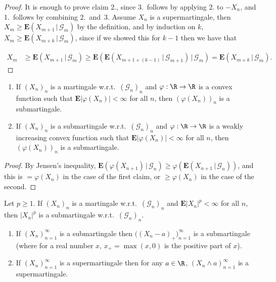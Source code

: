 \begin{proof}
It is enough to prove claim 2., since 3.\ follows by
applying 2. to $-X_n$, and 1.~follows by combining
2.~and~3. Assume $X_n$ is a supermartingale, then
$X_m\ge
\mathbf{E}\left(X_{m+1}\,|\,\mathcal{G}_m\right)$
by the definition, and by induction on $k$,
$X_m\ge
\mathbf{E}\left(X_{m+k}\,|\,\mathcal{G}_m\right)$,
since if we showed this for $k-1$ then we have that

\begin{align*}
X_m &\ge \mathbf{E}\left(X_{m+1}\,|\,\mathcal{G}_m\right)
\ge \mathbf{E}\left(\mathbf{E}\left(X_{m+1+(k-1)}\,|\,\mathcal{G}_{m+1}\right)\,|\,\mathcal{G}_m\right)
= \mathbf{E}\left(X_{m+k}\,|\,\mathcal{G}_m\right).
\end{align*}

\end{proof}

\begin{thm}

\begin{enumerate}[label=\arabic*.]
\item If $(X_n)_n$ is a martingale w.r.t.\
$(\mathcal{G}_n)_n$ and $\varphi:\R\to\R$ is a convex
function such that $\mathbf{E}|\varphi(X_n)|<\infty$
for all $n$, then $(\varphi(X_n))_n$ is a
submartingale.

\item If $(X_n)_n$ is a submartingale w.r.t.\
$(\mathcal{G}_n)_n$ and $\varphi:\R\to\R$ is a weakly
increasing convex function such that
$\mathbf{E}|\varphi(X_n)|<\infty$ for all $n$, then
$(\varphi(X_n))_n$ is a submartingale.
\end{enumerate}

\end{thm}

\begin{proof}
By Jensen's inequality,
$\mathbf{E}\left(\varphi(X_{n+1})\,|\,\mathcal{G}_n\right)
\ge
\varphi\left(\mathbf{E}\left(X_{n+1}\,|\,\mathcal{G}_n\right)\right)$,
and this is $= \varphi(X_n)$ in the case of the first
claim, or $\ge \varphi(X_n)$ in the case of the
second.
\end{proof}

\begin{cor}
Let $p\ge 1$. If $(X_n)_n$ is a martingale w.r.t.\
$(\mathcal{G}_n)_n$ and $\mathbf{E}|X_n|^p<\infty$
for all $n$, then $|X_n|^p$ is a submartingale
w.r.t.\ $(\mathcal{G}_n)_n$.
\end{cor}

\begin{cor}
\label{cor-positive-part}

\begin{enumerate}[label=\arabic*.]
\item If $(X_n)_{n=1}^\infty$ is a submartingale then
$\big((X_n-a)_+\big)_{n=1}^\infty$ is a submartingale
(where for a real number $x$, $x_+ = \max(x,0)$ is
the positive part of $x$).

\item If $(X_n)_{n=1}^\infty$ is a supermartingale then for
any $a\in\R$, $(X_n\wedge a)_{n=1}^\infty$ is a
supermartingale.
\end{enumerate}

\end{cor}

